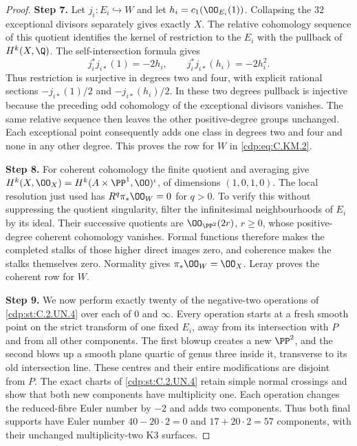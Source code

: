 \begin{proof}
\noindent\textbf{Step 7.} Let $j_i:E_i\hookrightarrow W$ and let
$h_i=c_1(\OO_{E_i}(1))$. Collapsing the $32$ exceptional
divisors separately gives exactly $X$. The relative
cohomology sequence of this quotient identifies the
kernel of restriction to the $E_i$ with the pullback
of $H^k(X,\Q)$. The self-intersection formula gives
\[
 j_i^*j_{i*}(1)=-2h_i,
       \qquad j_i^*j_{i*}(h_i)=-2h_i^2.                 \tag{C.KM.10}\label{cdp:eq:C.KM.10}
\]
Thus restriction is surjective in degrees two and four,
with explicit rational sections $-j_{i*}(1)/2$ and
$-j_{i*}(h_i)/2$. In these two degrees pullback is
injective because the preceding odd cohomology of the
exceptional divisors vanishes. The same relative
sequence then leaves the other positive-degree groups
unchanged. Each exceptional point consequently adds one
class in degrees two and four and none in any other
degree. This proves the row for $W$ in \eqref{cdp:eq:C.KM.2}.

\noindent\textbf{Step 8.} For coherent cohomology the finite quotient and averaging
give
$H^k(X,\OO_X)=H^k(A\times\PP^1,\OO)^{\iota}$,
of dimensions $(1,0,1,0)$. The local resolution just
used has $R^q\pi_*\OO_W=0$ for $q>0$. To verify this
without suppressing the quotient singularity, filter the
infinitesimal neighbourhoods of $E_i$ by its ideal.
Their successive quotients are $\OO_{\PP^2}(2r)$,
$r\ge0$, whose positive-degree coherent cohomology
vanishes. Formal functions therefore makes the completed
stalks of those higher direct images zero, and coherence
makes the stalks themselves zero. Normality gives
$\pi_*\OO_W=\OO_X$. Leray proves the coherent row for
$W$.

\noindent\textbf{Step 9.} We now perform exactly twenty of the negative-two
operations of \ref{cdp:st:C.2.UN.4} over each of $0$ and $\infty$.
Every operation starts at a fresh smooth point on the
strict transform of one fixed $E_i$, away from its
intersection with $P$ and from all other components.
The first blowup creates a new $\PP^2$, and the second
blows up a smooth plane quartic of genus three inside
it, transverse to its old intersection line. These
centres and their entire modifications are disjoint
from $P$. The exact charts of \ref{cdp:st:C.2.UN.4} retain simple
normal crossings and show that both new components
have multiplicity one. Each operation changes the
reduced-fibre Euler number by $-2$ and adds two
components. Thus both final supports have Euler number
$40-20\cdot2=0$ and $17+20\cdot2=57$ components,
with their unchanged multiplicity-two K3 surfaces.


\end{proof}
